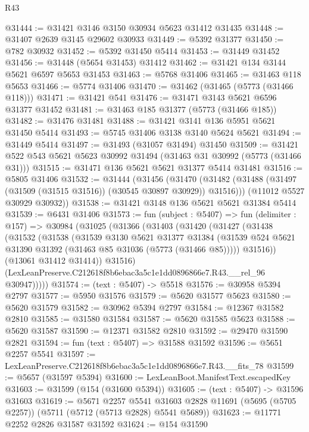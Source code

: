 \begin{lexlean}{R43}
\begin{coremodule}
@31444 := @31421 @3146 @3150 @30934 @5623 @31412 @31435
@31448 := @31407 @2639 @3145 @29602 @30933
@31449 := @5392 @31377
@31450 := @782 @30932
@31452 := @5392 @31450 @5414
@31453 := @31449 @31452
@31456 := @31448 (@5654 @31453) @31412
@31462 := @31421 @134 @3144 @5621 @6597 @5653 @31453
@31463 := @5768 @31406
@31465 := @31463 @118 @5653
@31466 := @5774 @31406
@31470 := @31462 (@31465 (@5773 (@31466 @118)))
@31471 := @31421 @541
@31476 := @31471 @3143 @5621 @6596 @31377 @31452
@31481 := @31463 @185 @31377 (@5773 (@31466 @185))
@31482 := @31476 @31481
@31488 := @31421 @3141 @136 @5951 @5621 @31450 @5414
@31493 := @5745 @31406 @3138 @3140 @5624 @5621
@31494 := @31449 @5414
@31497 := @31493 (@31057 @31494) @31450
@31509 := @31421 @522 @543 @5621 @5623 @30992 @31494 (@31463 @31 @30992 (@5773 (@31466 @31)))
@31515 := @31471 @136 @5621 @5621 @31377 @5414 @31481
@31516 := @5805 @31406
@31532 := @31444
    (@31456
      (@31470 (@31482 (@31488 (@31497 (@31509 (@31515 @31516)) (@30545 @30897 @30929)) @31516)))
      (@11012 @5527 @30929 @30932))
@31538 := @31421 @3148 @136 @5621 @5621 @31384 @5414
@31539 := @6431 @31406
@31573 := fun (subject : @5407) =>
  fun (delimiter : @157) =>
  @30984
    (@31025
      (@31366
        (@31403
          (@31420
            (@31427
              (@31438
                (@31532
                  (@31538
                    (@31539
                      @3130
                      @5621
                      @31377
                      @31384
                      (@31539 @524 @5621 @31390 @31392 (@31463 @85 @31036 (@5773 (@31466 @85)))))
                    @31516))
                (@13061 @31412 @31414))
              @31516)
            (LexLeanPreserve.C212618f8b6ebac3a5c1e1dd0896866e7.R43.__rel_96 @30947)))))
@31574 := (text : @5407) -> @5518
@31576 := @30958 @5394 @2797
@31577 := @5950 @31576
@31579 := @5620 @31577 @5623
@31580 := @5620 @31579
@31582 := @30962 @5394 @2797
@31584 := @12367 @31582 @2810
@31585 := @31580 @31584
@31587 := @5620 @31585 @5623
@31588 := @5620 @31587
@31590 := @12371 @31582 @2810
@31592 := @29470 @31590 @2821
@31594 := fun (text : @5407) => @31588 @31592
@31596 := @5651 @2257 @5541
@31597 := LexLeanPreserve.C212618f8b6ebac3a5c1e1dd0896866e7.R43.__fits_78
@31599 := @5657 (@31597 @5394)
@31600 := LexLeanBoot.ManifestText.escapedKey
@31603 := @31599 (@154 (@31600 @5394))
@31605 := (text : @5407) -> @31596 @31603
@31619 := @5671
    @2257
    @5541
    @31603
    @2828
    @11691
    (@5695 (@5705 @2257))
    (@5711 (@5712 (@5713 @2828) @5541 @5689))
@31623 := @11771 @2252 @2826 @31587 @31592
@31624 := @154 @31590

\end{coremodule}
\end{lexlean}
